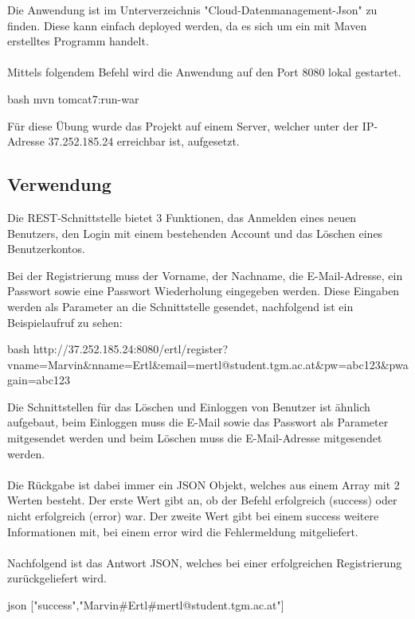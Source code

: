 Die Anwendung ist im Unterverzeichnis "Cloud-Datenmanagement-Json" zu finden. Diese kann einfach deployed werden, da es sich um ein mit Maven erstelltes Programm handelt.
\\\\
Mittels folgendem Befehl wird die Anwendung auf den Port 8080 lokal gestartet.

\begin{code}{bash}
	mvn tomcat7:run-war
\end{code}

Für diese Übung wurde das Projekt auf einem Server, welcher unter der IP-Adresse 37.252.185.24 erreichbar ist, aufgesetzt.

\subsection{Verwendung}

Die REST-Schnittstelle bietet 3 Funktionen, das Anmelden eines neuen Benutzers, den Login mit einem bestehenden Account und das Löschen eines Benutzerkontos.

Bei der Registrierung muss der Vorname, der Nachname, die E-Mail-Adresse, ein Passwort sowie eine Passwort Wiederholung eingegeben werden. Diese Eingaben werden als Parameter an die Schnittstelle gesendet, nachfolgend ist ein Beispielaufruf zu sehen:

\begin{code}{bash}
	http://37.252.185.24:8080/ertl/register?vname=Marvin&nname=Ertl&email=mertl@student.tgm.ac.at&pw=abc123&pwagain=abc123
\end{code}

Die Schnittstellen für das Löschen und Einloggen von Benutzer ist ähnlich aufgebaut, beim Einloggen muss die E-Mail sowie das Passwort als Parameter mitgesendet werden und beim Löschen muss die E-Mail-Adresse mitgesendet werden.
\\\\
Die Rückgabe ist dabei immer ein JSON Objekt, welches aus einem Array mit 2 Werten besteht. Der erste Wert gibt an, ob der Befehl erfolgreich (success) oder nicht erfolgreich (error) war. Der zweite Wert gibt bei einem success weitere Informationen mit, bei einem error wird die Fehlermeldung mitgeliefert.
\\\\
Nachfolgend ist das Antwort JSON, welches bei einer erfolgreichen Registrierung zurückgeliefert wird.

\begin{code}{json}
	["success","Marvin#Ertl#mertl@student.tgm.ac.at"]
\end{code}

